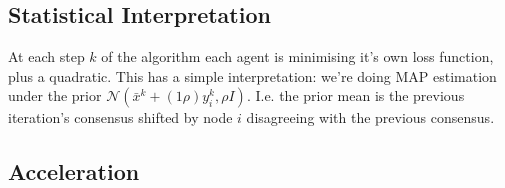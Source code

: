 \subsection{Statistical Interpretation}
At each step \(k\) of the algorithm each agent is minimising it's own loss function, plus a quadratic.
This has a simple interpretation: we're doing MAP estimation under the prior \(\mathcal{N}\left(\bar{x}^{k} + \left(1\rho\right)y_i^k, \rho I\right)\). I.e. the prior mean is the previous iteration's consensus shifted by node \(i\) disagreeing with the previous consensus. 

\subsection{Acceleration}